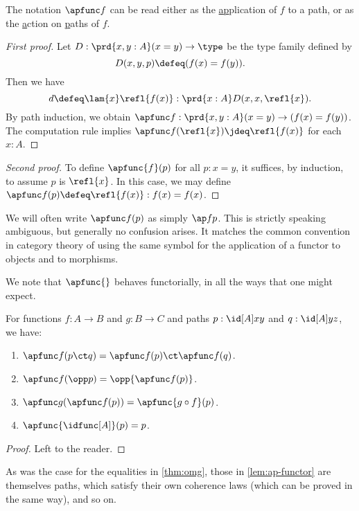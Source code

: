 The notation $\apfunc f$ can be read either as the \underline{ap}plication of $f$ to a path, or as the \underline{a}ction on \underline{p}aths of $f$.

\begin{proof}[First proof]
  Let $D:\prd{x,y:A} (x=y) \to \type$ be the type family defined by
  \[D(x,y,p)\defeq (f(x)= f(y)).\]
  Then we have
  \begin{equation*}
    d\defeq\lam{x} \refl{f(x)}:\prd{x:A} D(x,x,\refl{x}).
  \end{equation*}
  By path induction, we obtain $\apfunc f : \prd{x,y:A} (x=y) \to (f(x)=f(y))$.
  The computation rule implies $\apfunc f({\refl{x}})\jdeq\refl{f(x)}$ for each $x:A$.
\end{proof}

\begin{proof}[Second proof]
  To define $\apfunc{f}(p)$ for all $p:x=y$, it suffices, by induction, to assume
  $p$ is $\refl{x}$.
  In this case, we may define $\apfunc f(p) \defeq \refl{f(x)}:f(x)= f(x)$.
\end{proof}

We will often write $\apfunc f (p)$ as simply $\ap f p$.
This is strictly speaking ambiguous, but generally no confusion arises.
It matches the common convention in category theory of using the same symbol for the application of a functor to objects and to morphisms.

We note that $\apfunc{}$ behaves functorially, in all the ways that one might expect.

\begin{lem}\label{lem:ap-functor}
  For functions $f:A\to B$ and $g:B\to C$ and paths $p:\id[A]xy$ and $q:\id[A]yz$, we have:
  \begin{enumerate}
  \item $\apfunc f(p\ct q) = \apfunc f(p) \ct \apfunc f(q)$.\label{item:apfunctor-ct}
  \item $\apfunc f(\opp p) = \opp{\apfunc f (p)}$.\label{item:apfunctor-opp}
  \item $\apfunc g (\apfunc f(p)) = \apfunc{g\circ f} (p)$.\label{item:apfunctor-compose}
  \item $\apfunc {\idfunc[A]} (p) = p$.
  \end{enumerate}
\end{lem}
\begin{proof}
  Left to the reader.
\end{proof}
%

As was the case for the equalities in \cref{thm:omg}, those in \cref{lem:ap-functor} are themselves paths, which satisfy their own coherence laws (which can be proved in the same way), and so on.


